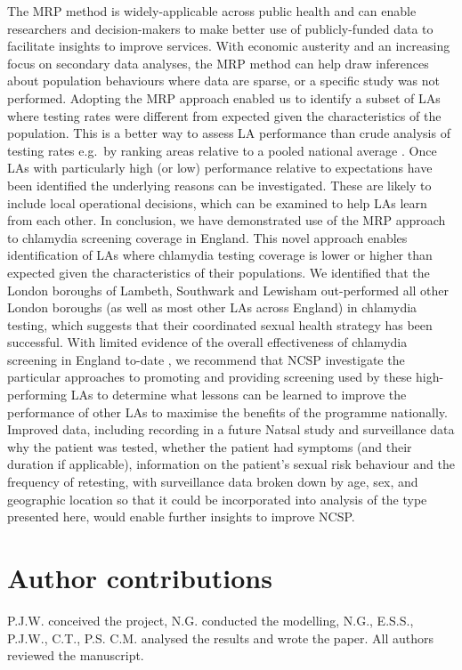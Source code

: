 \documentclass[fleqn,10pt]{wlscirep}
\begin{document}
The MRP method is widely-applicable across public health and can enable researchers and decision-makers to make better use of publicly-funded data to facilitate insights to improve services. With economic austerity and an increasing focus on secondary data analyses, the MRP method can help draw inferences about population behaviours where data are sparse, or a specific study was not performed. Adopting the MRP approach enabled us to identify a subset of LAs where testing rates were different from expected given the characteristics of the population. This is a better way to assess LA performance than crude analysis of testing rates e.g.\ by ranking areas relative to a pooled national average \cite{Editorial2016}. Once LAs with particularly high (or low) performance relative to expectations have been identified the underlying reasons can be investigated. These are likely to include local operational decisions, which can be examined to help LAs learn from each other. In conclusion, we have demonstrated use of the MRP approach to chlamydia screening coverage in England. This novel approach enables identification of LAs where chlamydia testing coverage is lower or higher than expected given the characteristics of their populations. We identified that the London boroughs of Lambeth, Southwark and Lewisham out-performed all other London boroughs (as well as most other LAs across England) in chlamydia testing, which suggests that their coordinated sexual health strategy \cite{LSLstrategy2014,MEDFASH2008} has been successful. With limited evidence of the overall effectiveness of chlamydia screening in England to-date \cite{Lewis2018}, we recommend that NCSP investigate the particular approaches to promoting and providing screening used by these high-performing LAs to determine what lessons can be learned to improve the performance of other LAs to maximise the benefits of the programme nationally. Improved data, including recording in a future Natsal study and surveillance data why the patient was tested, whether the patient had symptoms (and their duration if applicable), information on the patient’s sexual risk behaviour \cite{Lewis2017, Lewis2018} and the frequency of retesting, with surveillance data broken down by age, sex, and geographic location so that it could be incorporated into analysis of the type presented here, would enable further insights to improve NCSP.

\newpage


\section*{Author contributions}
P.J.W. conceived the project, N.G. conducted the modelling, N.G., E.S.S., P.J.W., C.T., P.S. C.M. analysed the results and wrote the paper. All authors reviewed the manuscript.
\end{document}
